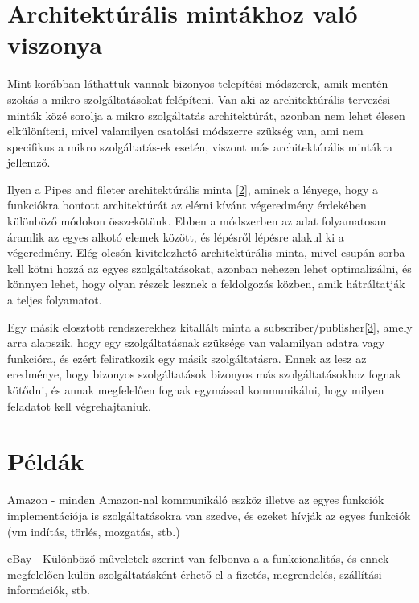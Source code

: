 \documentclass[11pt,magyar,a4paper,oneside,]{report}
\begin{document}
\section{Architektúrális mintákhoz való
viszonya}\label{architektuxfaruxe1lis-mintuxe1khoz-valuxf3-viszonya}

Mint korábban láthattuk vannak bizonyos telepítési módszerek, amik
mentén szokás a mikro szolgáltatásokat felépíteni. Van aki az
architektúrális tervezési minták közé sorolja a mikro szolgáltatás
architektúrát, azonban nem lehet élesen elkülöníteni, mivel valamilyen
csatolási módszerre szükség van, ami nem specifikus a mikro
szolgáltatás-ek esetén, viszont más architektúrális mintákra jellemző.

Ilyen a Pipes and fileter architektúrális minta
\href{https://msdn.microsoft.com/en-us/library/dn568100.aspx}{{[}2{]}},
aminek a lényege, hogy a funkciókra bontott architektúrát az elérni
kívánt végeredmény érdekében különböző módokon összekötünk. Ebben a
módszerben az adat folyamatosan áramlik az egyes alkotó elemek között,
és lépésről lépésre alakul ki a végeredmény. Elég olcsón kivitelezhető
architektúrális minta, mivel csupán sorba kell kötni hozzá az egyes
szolgáltatásokat, azonban nehezen lehet optimalizálni, és könnyen lehet,
hogy olyan részek lesznek a feldolgozás közben, amik hátráltatják a
teljes folyamatot.

Egy másik elosztott rendszerekhez kitallált minta a
subscriber/publisher\href{https://msdn.microsoft.com/en-us/library/ff649664.aspx}{{[}3{]}},
amely arra alapszik, hogy egy szolgáltatásnak szüksége van valamilyan
adatra vagy funkcióra, és ezért feliratkozik egy másik szolgáltatásra.
Ennek az lesz az eredménye, hogy bizonyos szolgáltatások bizonyos más
szolgáltatásokhoz fognak kötődni, és annak megfelelően fognak egymással
kommunikálni, hogy milyen feladatot kell végrehajtaniuk.

\section{Példák}\label{puxe9lduxe1k}

Amazon - minden Amazon-nal kommunikáló eszköz illetve az egyes funkciók
implementációja is szolgáltatásokra van szedve, és ezeket hívják az
egyes funkciók (vm indítás, törlés, mozgatás, stb.)

eBay - Különböző műveletek szerint van felbonva a a funkcionalitás, és
ennek megfelelően külön szolgáltatásként érhető el a fizetés,
megrendelés, szállítási információk, stb.
\end{document}
